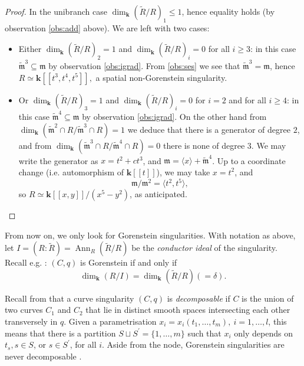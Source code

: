 \documentclass[11pt]{amsart}
\renewcommand{\k}{\mathbf k}
\newcommand{\m}{\mathfrak m}
\newcommand{\tR}{\widetilde{R}}
\newcommand{\tm}{\widetilde{\mathfrak m}}
\theoremstyle{plain}
\theoremstyle{definition}
\begin{document}
\begin{proof}
 In the unibranch case $\dim_\k(\tR/R)_1\leq 1$, hence equality holds (by observation \eqref{obs:add} above). We are left with two cases:
 \begin{itemize}[leftmargin=15pt]
  \item Either $\dim_\k(\tR/R)_2=1$ and $\dim_\k(\tR/R)_i=0$ for all $i\geq 3$: in this case $\tm^3\subseteq\m$ by observation \eqref{obs:igrad}. From \eqref{obs:ses} we see that $\tm^3=\m$, hence $R\simeq\k[\![t^3,t^4,t^5]\!],$ a spatial non-Gorenstein singularity.
  
  \item Or $\dim_\k(\tR/R)_3=1$ and $\dim_\k(\tR/R)_i=0$ for $i=2$ and for all $i\geq 4$: in this case $\tm^4\subseteq\m$ by observation \eqref{obs:igrad}. On the other hand from $\dim_\k(\tm^2\cap R/\tm^3\cap R)=1$ we deduce that there is a generator of degree $2$, and from $\dim_\k(\tm^3\cap R/\tm^4\cap R)=0$ there is none of degree $3$. We may write the generator as $x=t^2+ct^3$, and $\m=\langle x\rangle+\tm^4$. Up to a coordinate change (i.e. automorphism of $\k[\![t]\!]$), we may take $x=t^2$, and \[\m/\m^2=\langle t^2,t^5\rangle,\] so $R\simeq\k[\![x,y]\!]/(x^5-y^2)$, as anticipated.
 \end{itemize}
\end{proof}

From now on, we only look for Gorenstein singularities. With notation as above, let $I=(R:\tilde R)=\operatorname{Ann}_R(\tilde R/R)$ be the \emph{conductor ideal} of the singularity. Recall e.g. \cite[Proposition VIII.1.16]{AK}: $(C,q)$ is Gorenstein if and only if
\[\dim_\k(R/I)=\dim_\k(\tR/R)(=\delta).\]

Recall from \cite[Definition 2-1]{Stev} that a curve singularity $(C,q)$ is \emph{decomposable} if $C$ is the union of two curves $C_1$ and $C_2$ that lie in distinct smooth spaces intersecting each other transversely in $q$. Given a parametrisation $x_i=x_i(t_1,\ldots,t_m),\ i=1,\ldots,l$, this means that there is a partition $S\sqcup S^\prime=\{1,\ldots,m\}$ such that $x_i$ only depends on $t_s,s\in S$, or $s\in S^\prime$, for all $i$. Aside from the node, Gorenstein singularities are never decomposable \cite[Proposition 2.1]{AFSGm}.
\end{document}
